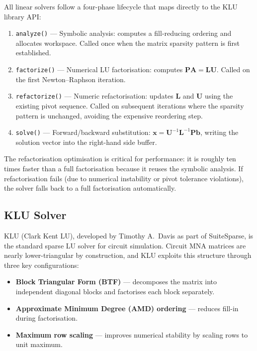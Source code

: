 All linear solvers follow a four-phase lifecycle that maps directly to the KLU library API:
\begin{enumerate}
  \item \texttt{analyze()} --- Symbolic analysis: computes a fill-reducing ordering and allocates workspace. Called once when the matrix sparsity pattern is first established.
  \item \texttt{factorize()} --- Numerical LU factorisation: computes $\mathbf{PA} = \mathbf{LU}$. Called on the first Newton--Raphson iteration.
  \item \texttt{refactorize()} --- Numeric refactorisation: updates $\mathbf{L}$ and $\mathbf{U}$ using the existing pivot sequence. Called on subsequent iterations where the sparsity pattern is unchanged, avoiding the expensive reordering step.
  \item \texttt{solve()} --- Forward/backward substitution: $\mathbf{x} = \mathbf{U}^{-1}\mathbf{L}^{-1}\mathbf{P}\mathbf{b}$, writing the solution vector into the right-hand side buffer.
\end{enumerate}

The refactorisation optimisation is critical for performance: it is roughly ten times faster than a full factorisation because it reuses the symbolic analysis. If refactorisation fails (due to numerical instability or pivot tolerance violations), the solver falls back to a full factorisation automatically.

\subsection{KLU Solver}

KLU (Clark Kent LU), developed by Timothy A.~Davis as part of SuiteSparse, is the standard sparse LU solver for circuit simulation. Circuit MNA matrices are nearly lower-triangular by construction, and KLU exploits this structure through three key configurations:
\begin{itemize}
  \item \textbf{Block Triangular Form (BTF)} --- decomposes the matrix into independent diagonal blocks and factorises each block separately.
  \item \textbf{Approximate Minimum Degree (AMD) ordering} --- reduces fill-in during factorisation.
  \item \textbf{Maximum row scaling} --- improves numerical stability by scaling rows to unit maximum.
\end{itemize}

